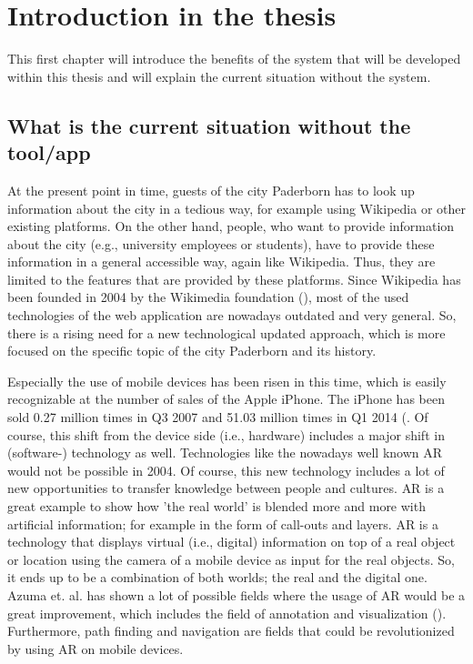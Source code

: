 \chapter[Introduction in the thesis]{Introduction in the thesis}
This first chapter will introduce the benefits of the system that will be developed within this thesis and will explain the current situation without the system.

\section{What is the current situation without the tool/app}
At the present point in time, guests of the city Paderborn has to look up information about the city in a tedious way, for example using Wikipedia or other existing platforms. On the other hand, people, who want to provide information about the city (e.g., university employees or students), have to provide these information in a general accessible way, again like Wikipedia. Thus, they are limited to the features that are provided by these platforms. Since Wikipedia has been founded in 2004 by the Wikimedia foundation (\cite{wikimedia}), most of the used technologies of the web application are nowadays outdated and very general. So, there is a rising need for a new technological updated approach, which is more focused on the specific topic of the city Paderborn and its history. 

Especially the use of mobile devices has been risen in this time, which is easily recognizable at the number of sales of the Apple iPhone. The iPhone has been sold 0.27 million times in Q3 2007 and 51.03 million times in Q1 2014 (\cite{statIPhone}. Of course, this shift from the device side (i.e., hardware) includes a major shift in (software-) technology as well. Technologies like the nowadays well known \ac{AR} would not be possible in 2004. Of course, this new technology includes a lot of new opportunities to transfer knowledge between people and cultures. \ac{AR} is a great example to show how 'the real world' is blended more and more with artificial information; for example in the form of call-outs and layers. \ac{AR} is a technology that displays virtual (i.e., digital) information on top of a real object or location using the camera of a mobile device as input for the real objects. So, it ends up to be a combination of both worlds; the real and the digital one. Azuma et. al. has shown a lot of possible fields where the usage of \ac{AR} would be a great improvement, which includes the field of annotation and visualization (\cite{Azu97}). Furthermore, path finding and navigation are fields that could be revolutionized by using \ac{AR} on mobile devices.

